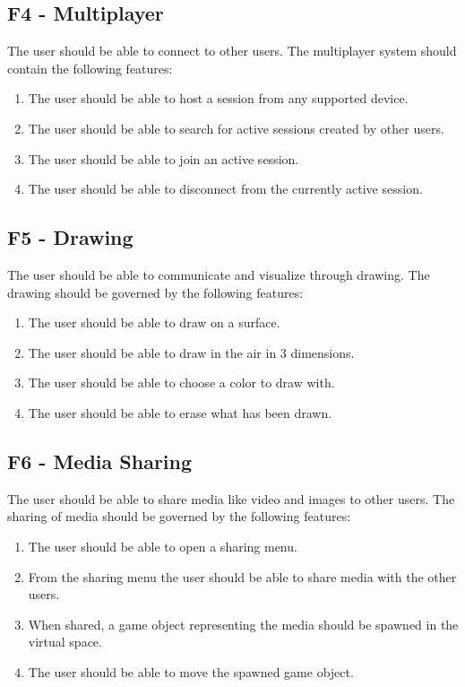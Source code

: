        \subsection{F4 - Multiplayer}
        The user should be able to connect to other users. The multiplayer system should contain the following features:
        \begin{enumerate}
            \item The user should be able to host a session from any supported device.
            \item The user should be able to search for active sessions created by other users.
            \item The user should be able to join an active session.
            \item The user should be able to disconnect from the currently active session.
        \end{enumerate}
        
        \subsection{F5 - Drawing}
        The user should be able to communicate and visualize through drawing. The drawing should be governed by the following features:
        \begin{enumerate}
            \item The user should be able to draw on a surface.
            \item The user should be able to draw in the air in 3 dimensions.
            \item The user should be able to choose a color to draw with.
            \item The user should be able to erase what has been drawn.
        \end{enumerate}
        
        \subsection{F6 - Media Sharing}
        The user should be able to share media like video and images to other users. The sharing of media should be governed by the following features:
        \begin{enumerate}
            \item The user should be able to open a sharing menu.
            \item From the sharing menu the user should be able to share media with the other users.
            \item When shared, a game object representing the media should be spawned in the virtual space.
            \item The user should be able to move the spawned game object.
        \end{enumerate}
        
